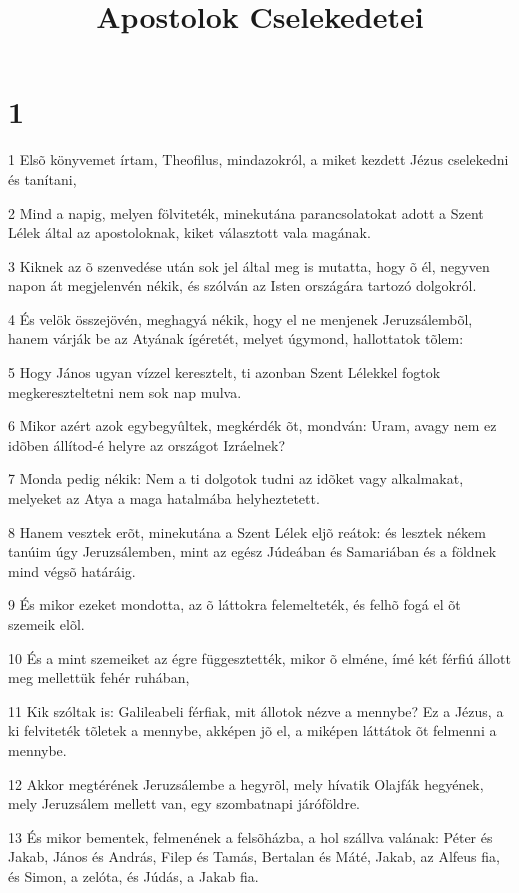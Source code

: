 

\title{Apostolok Cselekedetei}


\chapter{1}

\par 1 Elsõ könyvemet írtam, Theofilus, mindazokról, a miket kezdett Jézus cselekedni és tanítani,
\par 2 Mind a napig, melyen fölviteték, minekutána parancsolatokat adott a Szent Lélek által az apostoloknak, kiket választott vala magának.
\par 3 Kiknek az õ szenvedése után sok jel által meg is mutatta, hogy õ él, negyven napon át megjelenvén nékik, és szólván az Isten országára tartozó dolgokról.
\par 4 És velök összejövén, meghagyá nékik, hogy el ne menjenek Jeruzsálembõl, hanem várják be az Atyának ígéretét,  melyet úgymond, hallottatok tõlem:
\par 5 Hogy János ugyan vízzel keresztelt, ti azonban Szent Lélekkel fogtok megkereszteltetni nem sok nap mulva.
\par 6 Mikor azért azok egybegyûltek, megkérdék õt, mondván: Uram, avagy nem ez idõben állítod-é helyre az országot Izráelnek?
\par 7 Monda pedig nékik: Nem a ti dolgotok tudni az idõket vagy alkalmakat, melyeket az Atya a maga hatalmába helyheztetett.
\par 8 Hanem vesztek erõt, minekutána a Szent Lélek eljõ reátok: és lesztek nékem tanúim úgy Jeruzsálemben, mint az egész Júdeában és Samariában és a földnek mind végsõ határáig.
\par 9 És mikor ezeket mondotta, az õ láttokra felemelteték, és felhõ fogá el õt szemeik elõl.
\par 10 És a mint szemeiket az égre függesztették, mikor õ elméne, ímé két férfiú állott meg mellettük fehér ruhában,
\par 11 Kik szóltak is: Galileabeli férfiak, mit állotok nézve a mennybe? Ez a Jézus, a ki felviteték tõletek a mennybe, akképen jõ el, a miképen láttátok õt felmenni a mennybe.
\par 12 Akkor megtérének Jeruzsálembe a hegyrõl, mely hívatik Olajfák hegyének, mely Jeruzsálem mellett van, egy szombatnapi járóföldre.
\par 13 És mikor bementek, felmenének a felsõházba, a hol szállva valának: Péter és Jakab, János és András, Filep és Tamás, Bertalan és Máté, Jakab, az Alfeus fia, és Simon, a zelóta, és Júdás, a Jakab fia.
